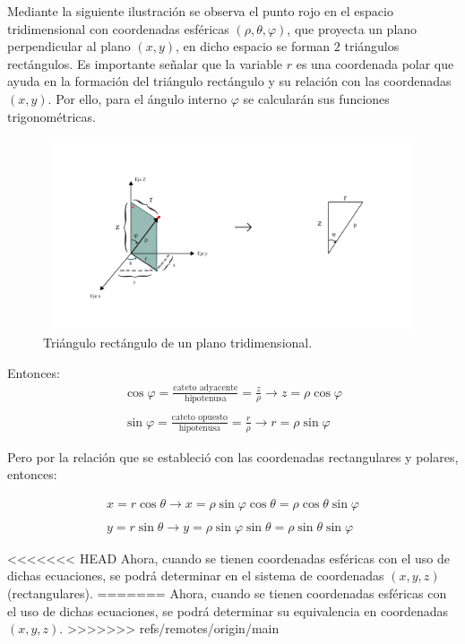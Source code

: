 Mediante la siguiente ilustración se observa el punto rojo en el espacio tridimensional con coordenadas esféricas ${\left(\rho,\theta,\varphi\right)}$, que proyecta un plano perpendicular al plano ${\left(x,y\right)}$, en dicho espacio se forman ${2}$ triángulos rectángulos. Es importante señalar que la variable ${r}$ es una coordenada polar que ayuda en la formación del triángulo rectángulo y su relación con las coordenadas ${\left(x,y\right)}$. Por ello, para el ángulo interno ${\varphi}$ se calcularán sus funciones trigonométricas.

\begin{figure}[H]
  \centering
  \includegraphics[width=11.17cm, height=5.67cm]{img/graph/coord_esf_2_rect_1.jpg}
  \caption{Triángulo rectángulo de un plano tridimensional.}
  \label{relacion_de_coordenadas}
\end{figure}

Entonces:
\begin{eqnarray*}
  \cos \varphi = \frac{\text{cateto adyacente}}{\text{hipotenusa}} = \frac{z}{\rho} \rightarrow z = \rho \cos \varphi\\\\
  \sin \varphi = \frac{\text{cateto opuesto}}{\text{hipotenusa}} = \frac{r}{\rho} \rightarrow r = \rho \sin \varphi
\end{eqnarray*}

\vspace{4mm}
Pero por la relación que se estableció con las coordenadas rectangulares y polares, entonces:

\begin{eqnarray*}
  x = r \cos \theta \rightarrow x = \rho \sin \varphi \cos \theta = \rho \cos \theta \sin \varphi\\\\
  y = r \sin \theta \rightarrow y = \rho \sin \varphi \sin \theta = \rho \sin \theta \sin \varphi
\end{eqnarray*}

\vspace{4mm}
<<<<<<< HEAD
Ahora, cuando se tienen coordenadas esféricas con el uso de dichas ecuaciones, se podrá determinar en el sistema de coordenadas $(x,y,z)$ (rectangulares).
=======
Ahora, cuando se tienen coordenadas esféricas con el uso de dichas ecuaciones, se podrá determinar su equivalencia en coordenadas ${\left(x,y,z\right)}$.
>>>>>>> refs/remotes/origin/main
